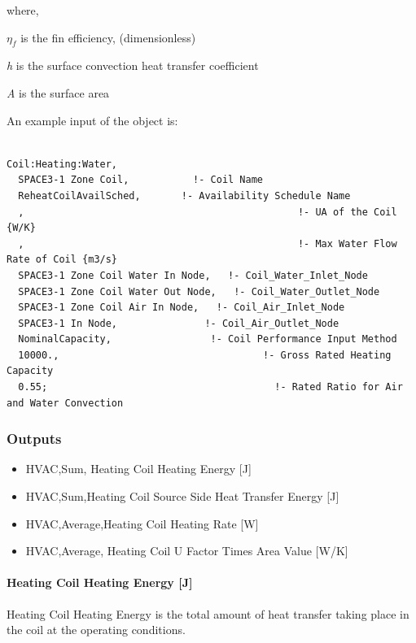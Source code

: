 where,

\({\eta_f}\) is the fin efficiency, (dimensionless)

\emph{h} is the surface convection heat transfer coefficient

\emph{A} is the surface area

An example input of the object is:

\begin{lstlisting}

Coil:Heating:Water,
  SPACE3-1 Zone Coil,           !- Coil Name
  ReheatCoilAvailSched,       !- Availability Schedule Name
  ,                                               !- UA of the Coil {W/K}
  ,                                               !- Max Water Flow Rate of Coil {m3/s}
  SPACE3-1 Zone Coil Water In Node,   !- Coil_Water_Inlet_Node
  SPACE3-1 Zone Coil Water Out Node,   !- Coil_Water_Outlet_Node
  SPACE3-1 Zone Coil Air In Node,   !- Coil_Air_Inlet_Node
  SPACE3-1 In Node,               !- Coil_Air_Outlet_Node
  NominalCapacity,                 !- Coil Performance Input Method
  10000.,                                   !- Gross Rated Heating Capacity
  0.55;                                       !- Rated Ratio for Air and Water Convection
\end{lstlisting}

\subsubsection{Outputs}\label{outputs-1-013}

\begin{itemize}
\item
  HVAC,Sum, Heating Coil Heating Energy {[}J{]}
\item
  HVAC,Sum,Heating Coil Source Side Heat Transfer Energy {[}J{]}
\item
  HVAC,Average,Heating Coil Heating Rate {[}W{]}
\item
  HVAC,Average, Heating Coil U Factor Times Area Value {[}W/K{]}
\end{itemize}

\paragraph{Heating Coil Heating Energy {[}J{]}}\label{heating-coil-heating-energy-j}

Heating Coil Heating Energy is the total amount of heat transfer taking place in the coil at the operating conditions.

